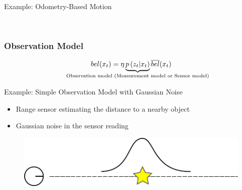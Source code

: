 \begin{frame}{Example: Odometry-Based Motion}
    
    \begin{figure}[!h]
    \centering
    \\
    \end{figure}
    
    \end{frame}
    
\begin{frame}
    \frametitle{Observation Model}
    \begin{equation*}
    bel(\state_{t}) = \eta \underbrace{p\left(\observation_{t} |\state_{t} \right)}_{\text{\makebox[0pt]{Observation model (Measurement model or Sensor model)}}} \overline{bel}(\state_{t})
    \end{equation*}
\end{frame}
    
\begin{frame}{Example: Simple Observation Model with Gaussian Noise}
    
    \begin{itemize}
        \item Range sensor estimating the distance to a nearby object
        \item Gaussian noise in the sensor reading
    \end{itemize} 
    
    \begin{figure}[!h]
        \includegraphics[width=0.6\columnwidth]{./images/simple_observation_model.pdf}
    \end{figure}    
\end{frame}